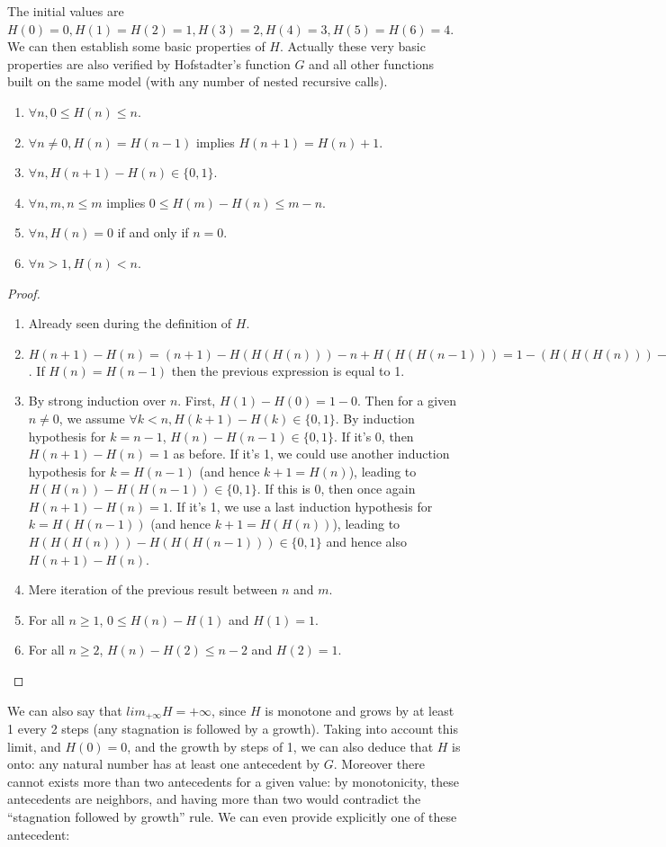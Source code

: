 \documentclass[a4paper,11pt]{article}
\begin{document}
The initial values are $H(0)=0, H(1)=H(2)=1, H(3)=2, H(4)=3, H(5)=H(6)=4$.
We can then establish some basic properties of $H$. Actually these
very basic properties are also verified by Hofstadter's function $G$
and all other functions built on the same model (with any number of
nested recursive calls).
\begin{theorem}\label{Gprops}
\noindent
\begin{enumerate}
\item $\forall n, 0 \le H(n) \le n$.
\item $\forall n\neq 0, H(n)=H(n-1)$ implies $H(n+1)=H(n)+1$.
\item $\forall n, H(n+1)-H(n) \in \{0,1\}$.
\item $\forall n,m, n\le m$ implies $0 \le H(m)-H(n) \le m-n$.
\item $\forall n, H(n)=0$ if and only if $n=0$.
\item $\forall n>1, H(n)<n$.
\end{enumerate}
\end{theorem}
\begin{proof}
\noindent
\begin{enumerate}
\item Already seen during the definition of $H$.
\item $H(n+1)-H(n) = (n+1)-H(H(H(n)))-n+H(H(H(n-1))) = 1 - (H(H(H(n)))-H(H(H(n-1))))$.
If $H(n)=H(n-1)$ then the previous expression is equal to 1.
\item By strong induction over $n$. First, $H(1)-H(0)=1-0$. Then
for a given $n\neq 0$, we assume $\forall k<n, H(k+1)-H(k) \in \{0,1\}$.
By induction hypothesis for $k=n-1$, $H(n)-H(n-1) \in\{0,1\}$.
If it's 0, then $H(n+1)-H(n) = 1$ as before. If it's 1, we could use another
induction hypothesis for $k=H(n-1)$ (and hence $k+1 = H(n)$), leading
to $H(H(n))-H(H(n-1)) \in \{0,1\}$. If this is 0, then once again
$H(n+1)-H(n) = 1$. If it's 1, we use a last induction hypothesis for
$k=H(H(n-1))$ (and hence $k+1 = H(H(n))$), leading to
$H(H(H(n)))-H(H(H(n-1))) \in \{0,1\}$ and hence also $H(n+1)-H(n)$.
\item Mere iteration of the previous result between $n$ and $m$.
\item For all $n\ge 1$, $0 \le H(n)-H(1)$ and $H(1)=1$.
\item For all $n\ge 2$, $H(n)-H(2) \le n-2$ and $H(2)=1$.
\end{enumerate}
\end{proof}

We can also say that $lim_{+\infty} H = +\infty$, since $H$ is
monotone and grows by at least 1 every 2 steps (any stagnation
is followed by a growth). Taking into account this limit, and
$H(0)=0$, and the growth by steps of 1, we can also deduce
that $H$ is onto: any natural number has at least one antecedent
by $G$. Moreover there cannot exists more than two antecedents
for a given value: by monotonicity, these antecedents are neighbors,
and having more than two would contradict the ``stagnation followed
by growth'' rule.
We can even provide explicitly one of these antecedent:
\end{document}
